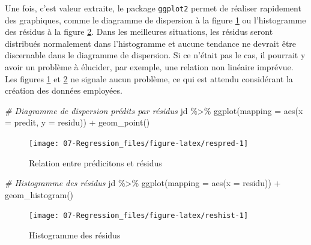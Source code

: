 \documentclass[
]{book}
\newenvironment{Shaded}{}{}
\newcommand{\AttributeTok}[1]{#1}
\newcommand{\CommentTok}[1]{\textit{#1}}
\newcommand{\FunctionTok}[1]{#1}
\newcommand{\NormalTok}[1]{#1}
\newcommand{\SpecialCharTok}[1]{#1}
\begin{document}
Une fois, c'est valeur extraite, le package \texttt{ggplot2} permet de réaliser rapidement des graphiques, comme le diagramme de dispersion à la figure \ref{fig:respred} ou l'histogramme des résidus à la figure \ref{fig:reshist}. Dans les meilleures situations, les résidus seront distribués normalement dans l'histogramme et aucune tendance ne devrait être discernable dans le diagramme de dispersion. Si ce n'était pas le cas, il pourrait y avoir un problème à élucider, par exemple, une relation non linéaire imprévue. Les figures \ref{fig:respred} et \ref{fig:reshist} ne signale aucun problème, ce qui est attendu considérant la création des données employées.

\begin{Shaded}
\begin{Highlighting}[]
\CommentTok{\# Diagramme de dispersion prédits par résidus}
\NormalTok{jd }\SpecialCharTok{\%\textgreater{}\%} 
  \FunctionTok{ggplot}\NormalTok{(}\AttributeTok{mapping =} \FunctionTok{aes}\NormalTok{(}\AttributeTok{x =}\NormalTok{ predit, }\AttributeTok{y =}\NormalTok{ residu)) }\SpecialCharTok{+} 
  \FunctionTok{geom\_point}\NormalTok{() }
\end{Highlighting}
\end{Shaded}

\begin{figure}

{\centering \texttt{[image: 07-Regression\_files/figure-latex/respred-1]} 

}

\caption{Relation entre prédicitons et résidus}\label{fig:respred}
\end{figure}

\begin{Shaded}
\begin{Highlighting}[]
\CommentTok{\# Histogramme des résidus}
\NormalTok{jd }\SpecialCharTok{\%\textgreater{}\%} 
  \FunctionTok{ggplot}\NormalTok{(}\AttributeTok{mapping =} \FunctionTok{aes}\NormalTok{(}\AttributeTok{x =}\NormalTok{ residu)) }\SpecialCharTok{+} 
  \FunctionTok{geom\_histogram}\NormalTok{()}
\end{Highlighting}
\end{Shaded}

\begin{figure}

{\centering \texttt{[image: 07-Regression\_files/figure-latex/reshist-1]} 

}

\caption{Histogramme des résidus}\label{fig:reshist}
\end{figure}
\end{document}
